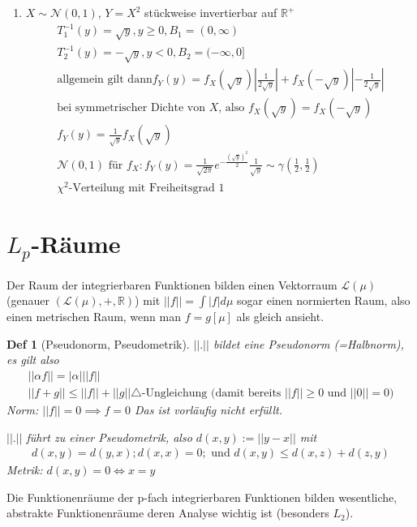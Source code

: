 \documentclass[]{article}
\newtheorem*{definition*}{Def}
\begin{document}
\begin{enumerate}
	\item $X \sim \mathcal{N}(0,1)$, $Y=X^2$ stückweise invertierbar auf $\mathbb{R}^+$
	\begin{align*}
		T_1^{-1}(y) = \sqrt{y}, y\geq 0, B_1 = (0, \infty)\\
		T_2^{-1}(y) = -\sqrt{y}, y < 0, B_2 = (-\infty, 0]\\
		\text{allgemein gilt dann} f_Y(y) = f_X(\sqrt{y}) \left| \frac{1}{2\sqrt{y}} \right| + f_X(-\sqrt{y}) \left| - \frac{1}{2\sqrt{y}} \right|\\
		\text{bei symmetrischer Dichte von $X$, also } f_X(\sqrt{y}) = f_X(-\sqrt{y})\\
		f_Y(y) = \frac{1}{\sqrt{y}} f_X(\sqrt{y})\\
		\mathcal{N}(0,1) \text{ für } f_X: f_Y(y) = \frac{1}{\sqrt{2\pi}} e^{-\frac{(\sqrt{y})^2}{2}} \frac{1}{\sqrt{y}} \sim \gamma(\frac{1}{2}, \frac{1}{2})\\
		\chi^2 \text{-Verteilung mit Freiheitsgrad 1}
	\end{align*}
\end{enumerate}

\section{$L_p$-Räume}
Der Raum der integrierbaren Funktionen bilden einen Vektorraum $\mathcal{L}(\mu)$ (genauer $(\mathcal{L}(\mu), +, \mathbb{R})$) mit $||f|| = \int |f| d\mu$ sogar einen normierten Raum, also einen metrischen Raum, wenn man $f=g [\mu]$ als gleich ansieht.

\begin{definition*}[Pseudonorm, Pseudometrik]
	$||.||$ bildet eine Pseudonorm (=Halbnorm), es gilt also
	\begin{align*}
		||\alpha f|| = |\alpha| ||f||\\
		||f+g|| \leq ||f|| + ||g|| \text{$\triangle$-Ungleichung (damit bereits $||f|| \geq 0$ und $||0|| = 0$)} 
	\end{align*}
	Norm: $||f||=0 \implies f=0$ Das ist vorläufig nicht erfüllt.
	
	$||.||$ führt zu einer Pseudometrik, also $d(x,y) := ||y-x||$ mit
	\begin{align*}
		d(x,y) = d(y,x); d(x,x)=0; \text{ und } d(x,y) \leq d(x,z) + d(z,y)
	\end{align*}
	Metrik: $d(x,y)=0 \iff x=y$
\end{definition*}

Die Funktionenräume der p-fach integrierbaren Funktionen bilden wesentliche, abstrakte Funktionenräume deren Analyse wichtig ist (besonders $L_2$).
\end{document}
